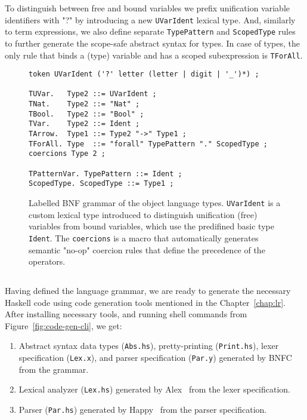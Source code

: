 To distinguish between free and bound variables we prefix unification variable identifiers with "?" by introducing a new \texttt{UVarIdent} lexical type. And, similarly to term expressions, we also define separate \texttt{TypePattern} and \texttt{ScopedType} rules to further generate the scope-safe abstract syntax for types. In case of types, the only rule that binds a (type) variable and has a scoped subexpression is \texttt{TForAll}.

\begin{figure}[H]
  \begin{verbatim}
token UVarIdent ('?' letter (letter | digit | '_')*) ;

TUVar.   Type2 ::= UVarIdent ;
TNat.    Type2 ::= "Nat" ;
TBool.   Type2 ::= "Bool" ;
TVar.    Type2 ::= Ident ;
TArrow.  Type1 ::= Type2 "->" Type1 ;
TForAll. Type  ::= "forall" TypePattern "." ScopedType ;
coercions Type 2 ;

TPatternVar. TypePattern ::= Ident ;
ScopedType. ScopedType ::= Type1 ;
  \end{verbatim}
  \caption[LBNF grammar of the object language types]{Labelled BNF grammar of the object language types. \texttt{UVarIdent} is a custom lexical type introduced to distinguish unification (free) variables from bound variables, which use the predifined basic type \texttt{Ident}. The \texttt{coercions} is a macro that automatically generates semantic "no-op" coercion rules that define the precedence of the operators.}
  \label{fig:lbnf-types}
\end{figure}


\subsection{}

Having defined the language grammar, we are ready to generate the necessary Haskell code using code generation tools mentioned in the Chapter~\ref{chap:lr}. After installing necessary tools, and running shell commands from Figure~\ref{fig:code-gen-cli}, we get:

\begin{enumerate}
  \item Abstract syntax data types (\texttt{Abs.hs}), pretty-printing (\texttt{Print.hs}), lexer specification (\texttt{Lex.x}), and parser specification (\texttt{Par.y}) generated by BNFC~\cite{BNFC} from the grammar.
  \item Lexical analyzer (\texttt{Lex.hs}) generated by Alex~\cite{haskell_alex} from the lexer specification.
  \item Parser (\texttt{Par.hs}) generated by Happy~\cite{haskell_happy} from the parser specification.
\end{enumerate}

